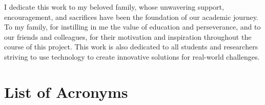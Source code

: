 \documentclass[12pt,a4paper,oneside]{report}
\begin{document}
I dedicate this work to my beloved family, whose unwavering support, encouragement, and sacrifices have been the foundation of our academic journey. To my family, for instilling in me the value of education and perseverance, and to our friends and colleagues, for their motivation and inspiration throughout the course of this project. This work is also dedicated to all students and researchers striving to use technology to create innovative solutions for real-world challenges.

\clearpage
\chapter*{List of Acronyms}
\end{document}
